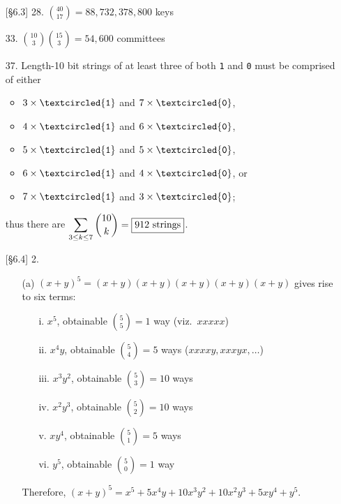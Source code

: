 \documentclass{article}
\begin{document}

\begin{enumerate}
    \item[{[\S 6.3]} 28.] $\displaystyle\binom{40}{17} = 88{,}732{,}378{,}800$ keys
    \item[33.] $\displaystyle\binom{10}{3}\binom{15}{3} = 54{,}600$ committees
    \item[37.] Length-10 bit strings of at least three of both \textcircled{\texttt{1}} and \textcircled{\texttt{0}} must be comprised of either
        \begin{itemize}
            \item $3\times\textcircled{\texttt{1}}$ and $7\times\textcircled{\texttt{0}}$,
            \item $4\times\textcircled{\texttt{1}}$ and $6\times\textcircled{\texttt{0}}$,
            \item $5\times\textcircled{\texttt{1}}$ and $5\times\textcircled{\texttt{0}}$,
            \item $6\times\textcircled{\texttt{1}}$ and $4\times\textcircled{\texttt{0}}$, or
            \item $7\times\textcircled{\texttt{1}}$ and $3\times\textcircled{\texttt{0}}$;
        \end{itemize}
    thus there are $\displaystyle\sum_{3 \le k \le 7} \binom{10}{k} = \fbox{912 strings}$.
    \item[{[\S 6.4]} 2.]
        \begin{itemize}
            \item[(a)] $(x+y)^5 = (x+y)(x+y)(x+y)(x+y)(x+y)$ gives rise to six terms:
                \begin{itemize}
                    \item[i.] $x^5$, obtainable $\binom{5}{5} = 1$ way (viz.~$xxxxx$)
                    \item[ii.] $x^4 y$, obtainable $\binom{5}{4} = 5$ ways ($xxxxy, xxxyx, \ldots$)
                    \item[iii.] $x^3 y^2$, obtainable $\binom{5}{3} = 10$ ways
                    \item[iv.] $x^2 y^3$, obtainable $\binom{5}{2} = 10$ ways
                    \item[v.] $x y^4$, obtainable $\binom{5}{1} = 5$ ways
                    \item[vi.] $y^5$, obtainable $\binom{5}{0} = 1$ way
                \end{itemize}
            Therefore, $(x+y)^5 = x^5 + 5 x^4 y + 10 x^3 y^2 + 10 x^2 y^3 + 5 x y^4 + y^5$.
            

\end{itemize}
\end{enumerate}
\end{document}
